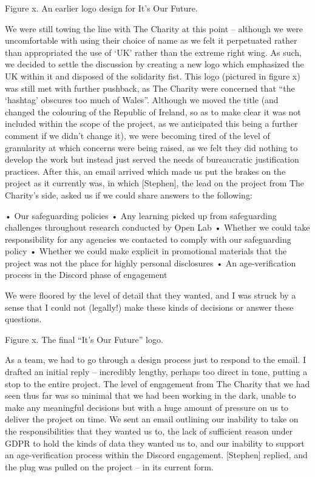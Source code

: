 Figure x. An earlier logo design for It’s Our Future. 


We were still towing the line with The Charity at this point – although we were uncomfortable with using their choice of name as we felt it perpetuated rather than appropriated the use of ‘UK’ rather than the extreme right wing. As such, we decided to settle the discussion by creating a new logo which emphasized the UK within it and disposed of the solidarity fist.   This logo (pictured in figure x) was still met with further pushback, as The Charity were concerned that “the ‘hashtag’ obscures too much of Wales”. Although we moved the title (and changed the colouring of the Republic of Ireland, so as to make clear it was not included within the scope of the project, as we anticipated this being a further comment if we didn’t change it), we were becoming tired of the level of granularity at which concerns were being raised, as we felt they did nothing to develop the work but instead just served the needs of bureaucratic justification practices. After this, an email arrived which made us put the brakes on the project as it currently was, in which [Stephen], the lead on the project from The Charity’s side, asked us if we could share answers to the following:
	
•	Our safeguarding policies
•	Any learning picked up from safeguarding challenges throughout research conducted by Open Lab 
•	Whether we could take responsibility for any agencies we contacted to comply with our safeguarding policy
•	Whether we could make explicit in promotional materials that the project was not the place for highly personal disclosures
•	An age-verification process in the Discord phase of engagement 

We were floored by the level of detail that they wanted, and I was struck by a sense that I could not (legally!) make these kinds of decisions or answer these questions. 

Figure x. The final “It’s Our Future” logo.

As a team, we had to go through a design process just to respond to the email.  I drafted an initial reply – incredibly lengthy, perhaps too direct in tone, putting a stop to the entire project. The level of engagement from The Charity that we had seen thus far was so minimal that we had been working in the dark, unable to make any meaningful decisions but with a huge amount of pressure on us to deliver the project on time.  We sent an email outlining our inability to take on the responsibilities that they wanted us to, the lack of sufficient reason under GDPR to hold the kinds of data they wanted us to, and our inability to support an age-verification process within the Discord engagement. [Stephen] replied, and the plug was pulled on the project – in its current form. 

